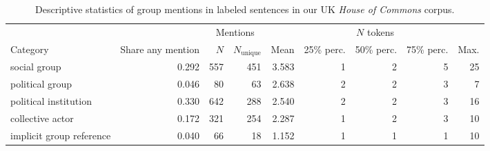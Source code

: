 \begin{table}[!t]

\caption{\label{tab:mention_descriptives_uk_commons}Descriptive statistics of group mentions in labeled sentences in our UK \emph{House of Commons} corpus.}
\centering
\fontsize{10}{12}\selectfont
\begin{tabular}[t]{lrrrrrrrr}
\toprule
\multicolumn{2}{c}{ } & \multicolumn{2}{c}{Mentions} & \multicolumn{5}{c}{$N$ tokens} \\
\cmidrule(l{3pt}r{3pt}){3-4} \cmidrule(l{3pt}r{3pt}){5-9}
Category & Share any mention & $N$ & $N_{\text{unique}}$ & Mean & 25\% perc. & 50\% perc. & 75\% perc. & Max.\\
\midrule
social group & 0.292 & 557 & 451 & 3.583 & 1 & 2 & 5 & 25\\
political group & 0.046 & 80 & 63 & 2.638 & 2 & 2 & 3 & 7\\
political institution & 0.330 & 642 & 288 & 2.540 & 2 & 2 & 3 & 16\\
collective actor & 0.172 & 321 & 254 & 2.287 & 1 & 2 & 3 & 10\\
implicit group reference & 0.040 & 66 & 18 & 1.152 & 1 & 1 & 1 & 10\\
\bottomrule
\end{tabular}
\end{table}
